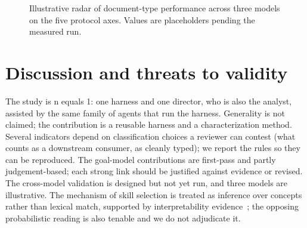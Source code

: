 \documentclass[sigconf]{acmart}
\begin{document}
\begin{figure}[t]
\centering
{}
\caption{Illustrative radar of document-type performance across three models on the five protocol axes. Values are placeholders pending the measured run.}
\label{fig:radar}
\end{figure}

\section{Discussion and threats to validity}
The study is n equals 1: one harness and one director, who is also the analyst, assisted by the same family of agents that run the harness. Generality is not claimed; the contribution is a reusable harness and a characterization method. Several indicators depend on classification choices a reviewer can contest (what counts as a downstream consumer, as cleanly typed); we report the rules so they can be reproduced. The goal-model contributions are first-pass and partly judgement-based; each strong link should be justified against evidence or revised. The cross-model validation is designed but not yet run, and three models are illustrative. The mechanism of skill selection is treated as inference over concepts rather than lexical match, supported by interpretability evidence~\cite{templeton2024monosemanticity}; the opposing probabilistic reading is also tenable and we do not adjudicate it.
\end{document}
